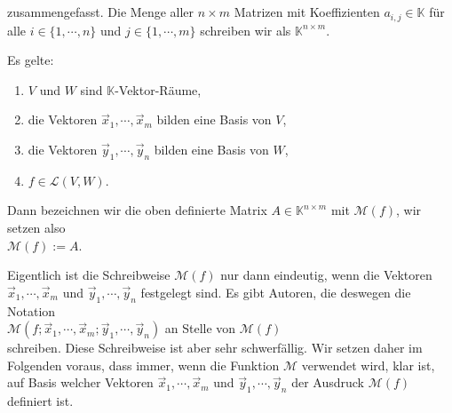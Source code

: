 \\[0.2cm]
\hspace*{1.3cm}
\colorbox{red}{}
\\[0.2cm]
zusammengefasst.  Die Menge aller $n \times m$ Matrizen mit Koeffizienten $a_{i,j} \in \mathbb{K}$
f\"{u}r alle $i \in \{1,\cdots,n\}$ und $j \in \{1,\cdots,m\}$ schreiben wir als $\mathbb{K}^{n \times
  m}$.

\begin{Definition}[$\mathcal{M}(f)$]
Es gelte:
\begin{enumerate}
\item $V$ und $W$ sind $\mathbb{K}$-Vektor-R\"{a}ume,
\item die Vektoren $\vec{x}_1, \cdots, \vec{x}_m$ bilden eine Basis von $V$,
\item die Vektoren $\vec{y}_1, \cdots, \vec{y}_n$ bilden eine Basis  von $W$,
\item $f \in \mathcal{L}(V, W)$.
\end{enumerate}
Dann bezeichnen wir die oben definierte Matrix $A \in \mathbb{K}^{n \times m}$ 
mit $\mathcal{M}(f)$, wir setzen also
\\[0.2cm]
\hspace*{1.3cm}
$\mathcal{M}(f) := A$. 
\eoxs
\end{Definition}

\remark
Eigentlich ist die Schreibweise $\mathcal{M}(f)$ nur dann eindeutig, wenn die Vektoren
$\vec{x}_1, \cdots, \vec{x}_m$ und $\vec{y}_1, \cdots, \vec{y}_n$ festgelegt sind.  Es
gibt Autoren, die deswegen die Notation
\\[0.2cm]
\hspace*{1.3cm}
$\mathcal{M}(f;\vec{x}_1, \cdots, \vec{x}_m; \vec{y}_1, \cdots, \vec{y}_n)$
\quad an Stelle von \quad $\mathcal{M}(f)$
\\[0.2cm]
schreiben.  Diese Schreibweise ist aber sehr schwerf\"{a}llig.  Wir
setzen daher im Folgenden voraus, dass immer, wenn die Funktion $\mathcal{M}$ verwendet wird, 
klar ist, auf Basis welcher Vektoren $\vec{x}_1, \cdots, \vec{x}_m$ und $\vec{y}_1, \cdots, \vec{y}_n$  
der Ausdruck $\mathcal{M}(f)$ definiert ist.

